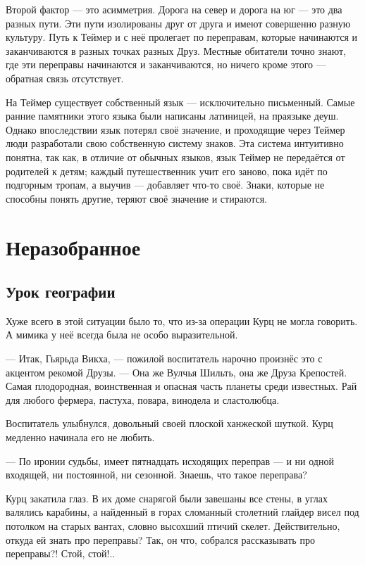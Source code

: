 Второй фактор --- это асимметрия.
Дорога на север и дорога на юг --- это два разных пути.
Эти пути изолированы друг от друга и имеют совершенно разную культуру.
Путь к Теймер и с неё пролегает по переправам, которые начинаются и заканчиваются в разных точках разных Друз.
Местные обитатели точно знают, где эти переправы начинаются и заканчиваются, но ничего кроме этого --- обратная связь отсутствует.

На Теймер существует собственный язык --- исключительно письменный.
Самые ранние памятники этого языка были написаны латиницей, на праязыке деуш.
Однако впоследствии язык потерял своё значение, и проходящие через Теймер люди разработали свою собственную систему знаков.
Эта система интуитивно понятна, так как, в отличие от обычных языков, язык Теймер не передаётся от родителей к детям;
каждый путешественник учит его заново, пока идёт по подгорным тропам, а выучив --- добавляет что-то своё.
Знаки, которые не способны понять другие, теряют своё значение и стираются.

\chapter{Неразобранное}

\section{Урок географии}

Хуже всего в этой ситуации было то, что из-за операции Курц не могла говорить.
А мимика у неё всегда была не особо выразительной.

--- Итак, Гьярьда Викха, --- пожилой воспитатель нарочно произнёс это с акцентом рекомой Друзы.
--- Она же Вулчья Шильть, она же Друза Крепостей.
Самая плодородная, воинственная и опасная часть планеты среди известных.
Рай для любого фермера, пастуха, повара, винодела и сластолюбца.

Воспитатель улыбнулся, довольный своей плоской ханжеской шуткой.
Курц медленно начинала его не любить.

--- По иронии судьбы, имеет пятнадцать исходящих переправ --- и ни одной входящей, ни постоянной, ни сезонной.
Знаешь, что такое переправа?

Курц закатила глаз.
В их доме снарягой были завешаны все стены, в углах валялись карабины, а найденный в горах сломанный столетний глайдер висел под потолком на старых вантах, словно высохший птичий скелет.
Действительно, откуда ей знать про переправы?
Так, он что, собрался рассказывать про переправы?!
Стой, стой!..

